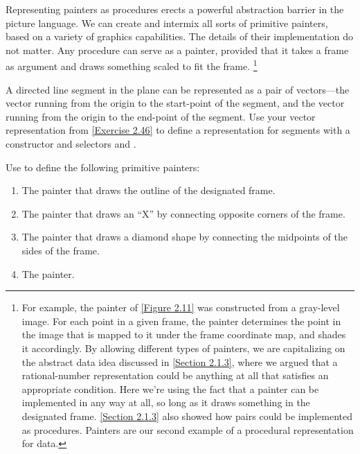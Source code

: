Representing painters as procedures erects a powerful abstraction barrier in the picture language.
We can create and intermix all sorts of primitive painters, based on a variety of graphics capabilities.
The details of their implementation do not matter.
Any procedure can serve as a painter, provided that it takes a frame as argument and draws something scaled to fit the frame.%
\footnote{
	For example, the  painter of \cref{Figure 2.11} was constructed from a gray-level image.
	For each point in a given frame, the  painter determines the point in the image that is mapped to it under the frame coordinate map, and shades it accordingly.
	By allowing different types of painters, we are capitalizing on the abstract data idea discussed in \cref{Section 2.1.3}, where we argued that a rational-number representation could be anything at all that satisfies an appropriate condition.
	Here we’re using the fact that a painter can be implemented in any way at all, so long as it draws something in the designated frame.
	\cref{Section 2.1.3} also showed how pairs could be implemented as procedures.
	Painters are our second example of a procedural representation for data.
}



\begin{exercise}
	\label{Exercise 2.48}
	A directed line segment in the plane can be represented as a pair of vectors---the vector running from the origin to the start-point of the segment, and the vector running from the origin to the end-point of the segment.
	Use your vector representation from \cref{Exercise 2.46} to define a representation for segments with a constructor  and selectors  and .
\end{exercise}



\begin{exercise}
	\label{Exercise 2.49}
	Use  to define the following primitive painters:
	\begin{enumerate}[label = \alph*., leftmargin = *]

		\item
			The painter that draws the outline of the designated frame.

		\item
			The painter that draws an “X” by connecting opposite corners of the frame.

		\item
			The painter that draws a diamond shape by connecting the midpoints of the sides of the frame.

		\item
			The  painter.

	\end{enumerate}
\end{exercise}



